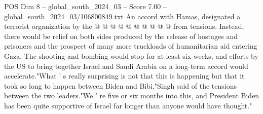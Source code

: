 \begin{textsample}{POS Dim 8 – global\_south\_2024\_03 – Score 7.00 – global\_south\_2024\_03/106800849.txt}
An accord with Hamas, designated a terrorist organization by the @ @ @ @ @ @ @ @ @ @ from tensions.
Instead, there would be relief on both sides produced by the release of hostages and prisoners and the prospect of many more truckloads of humanitarian aid entering Gaza.
The shooting and bombing would stop for at least six weeks, and efforts by the US to bring together Israel and Saudi Arabia on a long-term accord would accelerate."What ' s really surprising is not that this is happening but that it took so long to happen between Biden and Bibi,"Singh said of the tensions between the two leaders."We ' re five or six months into this, and President Biden has been quite supportive of Israel far longer than anyone would have thought."

\end{textsample}

